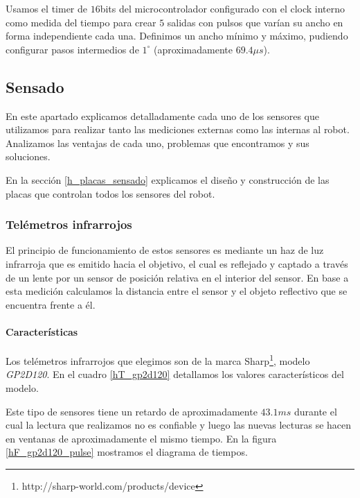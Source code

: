 Usamos el timer de $16$bits del microcontrolador configurado con el clock interno como medida del tiempo para crear $5$ salidas con
pulsos que var\'ian su ancho en forma independiente cada una.
Definimos un ancho m\'inimo y m\'aximo, pudiendo configurar pasos intermedios de $1^{\circ}$ (aproximadamente $69.4\mu s$).

\subsection{Sensado}
\label{h_sensado}

En este apartado explicamos detalladamente cada uno de los sensores que utilizamos para realizar tanto las mediciones externas como las internas al robot.
Analizamos las ventajas de cada uno, problemas que encontramos y sus soluciones.

En la secci\'on \ref{h_placas_sensado} explicamos el dise\~no y construcci\'on de las placas que controlan todos los sensores del robot.

\subsubsection{Tel\'emetros infrarrojos}
\label{h_sensado_telemetros}

El principio de funcionamiento de estos sensores es mediante un haz de luz infrarroja que es emitido hacia el objetivo, el cual
es reflejado y captado a trav\'es de un lente por un sensor de posici\'on relativa en el interior del sensor.
En base a esta medici\'on calculamos la distancia entre el sensor y el objeto reflectivo que se encuentra frente a \'el.

\paragraph{Caracter\'isticas}
\label{h_sensado_telemetros_caracteristicas}

Los tel\'emetros infrarrojos que elegimos son de la marca Sharp\footnote{http://sharp-world.com/products/device}, modelo \emph{GP2D120}.
En el cuadro \ref{hT_gp2d120} detallamos los valores caracter\'isticos del modelo.

Este tipo de sensores tiene un retardo de aproximadamente $43.1ms$ durante el cual la lectura que realizamos no es confiable y luego
las nuevas lecturas se hacen en ventanas de aproximadamente el mismo tiempo.
En la figura \ref{hF_gp2d120_pulse} mostramos el diagrama de tiempos.

